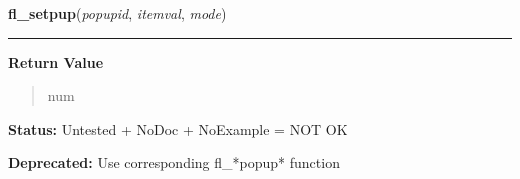    \label{xformslib:library:fl_setpup_mode}

    \vspace{0.5ex}

\hspace{.8\funcindent}\begin{boxedminipage}{\funcwidth}

    \raggedright \textbf{fl\_setpup}(\textit{popupid}, \textit{itemval}, \textit{mode})

    \vspace{-1.5ex}

    \rule{\textwidth}{0.5\fboxrule}
\setlength{\parskip}{2ex}
\setlength{\parskip}{1ex}
      \textbf{Return Value}
    \vspace{-1ex}

      \begin{quote}
      num

      \end{quote}

\textbf{Status:} Untested + NoDoc + NoExample = NOT OK



\textbf{Deprecated:} Use corresponding fl\_*popup* function



    \end{boxedminipage}

    \label{xformslib:library:fl_create_xyplot}

    \vspace{0.5ex}

